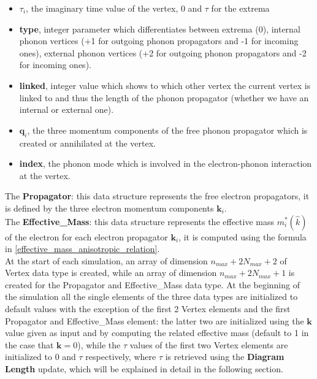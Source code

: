 \begin{itemize}
    \item $\tau_i$, the imaginary time value of the vertex, 0 and $\tau$ for the extrema
    \item \textbf{type}, integer parameter which differentiates between extrema (0), internal phonon vertices (+1 for outgoing phonon propagators 
    and -1 for incoming ones), external phonon vertices (+2 for outgoing phonon propagators and -2 for incoming ones).
    \item \textbf{linked}, integer value which shows to which other vertex the current vertex is linked to and thus the length of the 
    phonon propagator (whether we have an internal or external one).
    \item $\mathbf{q}_i$, the three momentum components of the free phonon propagator which is created or annihilated at the vertex.
    \item \textbf{index}, the phonon mode which is involved in the electron-phonon interaction at the vertex. 
\end{itemize}
The \textbf{Propagator}: this data structure represents the free electron propagators, it is defined by the three electron momentum components 
$\mathbf{k}_i$.\\
The \textbf{Effective\_Mass}: this data structure represents the effective mass $m^*_i(\hat{k})$ of the electron for each electron propagator $\mathbf{k}_i$, 
it is computed using the formula in \ref{effective_mass_anisotropic_relation}.\\
At the start of each simulation, an array of dimension $n_{max}+2N_{max}+2$ of Vertex data type is created, while an array of dimension 
$n_{max}+2N_{max}+1$ is created for the Propagator and Effective\_Mass data type. At the beginning of the simulation all the single elements of the three data types 
are initialized to default values with the exception of the first 2 Vertex elements and the first Propagator and Effective\_Mass 
element: the latter two are initialized using the $\mathbf{k}$ value given as input and by computing the related effective mass (default to 
1 in the case that $\mathbf{k}=0$), while the $\tau$ values of the first two Vertex elements are initialized to 0 and $\tau$ respectively, where 
$\tau$ is retrieved using the \textbf{Diagram Length} update, which will be explained in detail in the following section.
